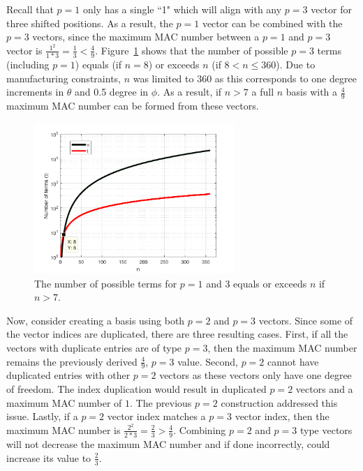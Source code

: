 \documentclass[3p,times]{elsarticle}
\begin{document}
Recall that $p=1$ only has a single ``1" which will align with any $p=3$ vector for three shifted positions.  
As a result, the $p=1$ vector can be combined with the $p=3$ vectors, since the maximum MAC number between a $p=1$ and $p=3$ vector is $\frac{1^2}{1*3}=\frac{1}{3} < \frac{4}{9}$.  
Figure~\ref{fig:terms} shows that the number of possible $p=3$ terms (including $p=1$) equals (if $n=8$) or exceeds $n$ (if $8<n\le 360$).  
Due to manufacturing constraints, $n$ was limited to 360 as this corresponds to one degree increments in $\theta$ and 0.5 degree in $\phi$.  
As a result, if $n>7$ a full $n$ basis with a $\frac{4}{9}$ maximum MAC number can be formed from these vectors.

\begin{figure}[ht!]
\includegraphics[width={3.0in}]{../figs/TermPlot.pdf}
\centering
\caption{The number of possible terms for $p=1$ and 3 equals or exceeds $n$ if $n>7$.}
\label{fig:terms}
\end{figure}

Now, consider creating a basis using both $p=2$ and $p=3$ vectors.  Since some of the vector indices are duplicated, there are three resulting cases.
First, if all the vectors with duplicate entries are of type $p=3$, then the maximum MAC number remains the previously derived $\frac{4}{9}$, $p=3$ value.  
Second, $p=2$ cannot have duplicated entries with other $p=2$ vectors as these vectors only have one degree of freedom.  The index duplication would
result in duplicated $p=2$ vectors and a maximum MAC number of $1$.  The previous $p=2$ construction addressed this issue.
Lastly, if a $p=2$ vector index matches a $p=3$ vector index, then the maximum MAC number is $\frac{2^2}{2*3}=\frac{2}{3}>\frac{4}{9}$.  
Combining $p=2$ and $p=3$ type vectors will not decrease the maximum MAC number and if done incorrectly, could increase its value
to $\frac{2}{3}$.
\end{document}
